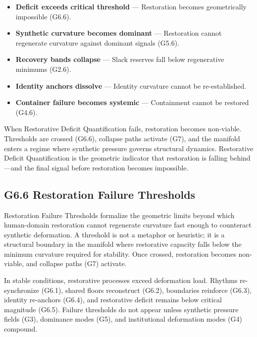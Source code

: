 \begin{itemize}[leftmargin=1.2cm]
    \item \textbf{Deficit exceeds critical threshold} — Restoration becomes
    geometrically impossible (G6.6).

    \item \textbf{Synthetic curvature becomes dominant} — Restoration cannot
    regenerate curvature against dominant signals (G5.6).

    \item \textbf{Recovery bands collapse} — Slack reserves fall below
    regenerative minimums (G2.6).

    \item \textbf{Identity anchors dissolve} — Identity curvature cannot be
    re-established.

    \item \textbf{Container failure becomes systemic} — Containment cannot be
    restored (G4.6).
\end{itemize}

\medskip

\noindent When Restorative Deficit Quantification fails, restoration becomes
non-viable. Thresholds are crossed (G6.6), collapse paths activate (G7), and the
manifold enters a regime where synthetic pressure governs structural dynamics.
Restorative Deficit Quantification is the geometric indicator that restoration is
falling behind—and the final signal before restoration becomes impossible.

\subsection*{G6.6 Restoration Failure Thresholds}

\noindent Restoration Failure Thresholds formalize the geometric limits beyond
which human-domain restoration cannot regenerate curvature fast enough to
counteract synthetic deformation. A threshold is not a metaphor or heuristic; it
is a structural boundary in the manifold where restorative capacity falls below
the minimum curvature required for stability. Once crossed, restoration becomes
non-viable, and collapse paths (G7) activate.

\medskip

\noindent In stable conditions, restorative processes exceed deformation load.
Rhythms re-synchronize (G6.1), shared floors reconstruct (G6.2), boundaries
reinforce (G6.3), identity re-anchors (G6.4), and restorative deficit remains
below critical magnitude (G6.5). Failure thresholds do not appear unless
synthetic pressure fields (G3), dominance modes (G5), and institutional
deformation modes (G4) compound.

